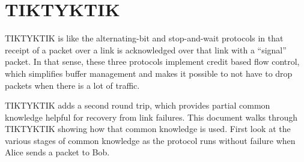 \documentclass[../../../OAE-SPEC-MAIN.tex]{subfiles}
\begin{document}
\section{TIKTYKTIK}

TIKTYKTIK is like the alternating-bit and stop-and-wait protocols in that receipt of a
packet over a link is acknowledged over that link with a “signal” packet. 
In that sense,
these three protocols implement credit based flow control, which simplifies buﬀer management and makes it possible to not have to drop packets when there is a lot of traﬃc.

TIKTYKTIK adds a second round trip, which provides partial common knowledge
helpful for recovery from link failures. This document walks through TIKTYKTIK
showing how that common knowledge is used.
First look at the various stages of common knowledge as the protocol runs without
failure when Alice sends a packet to Bob.
\end{document}
